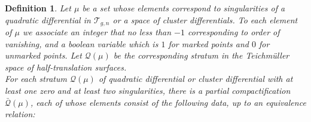 \documentclass[12pt]{article}
\newtheorem{definition}[theorem]{Definition}
\begin{document}
\begin{definition}\label{DefCompactification} Let $\mu$ be a set whose elements correspond to singularities of a quadratic differential in $\mathcal{T}_{g,n}$ or a space of cluster differentials. To each element of $\mu$ we associate an integer that no less than $-1$ corresponding to order of vanishing, and a boolean variable which is $1$ for marked points and $0$ for unmarked points. Let $\mathcal{Q}(\mu)$ be the corresponding stratum in the Teichm\"uller space of half-translation surfaces.\\

\noindent For each stratum $\mathcal{Q}(\mu)$ of quadratic differential or cluster differential with at least one zero and at least two singularities, there is a partial compactification $\bar{\mathcal{Q}}(\mu)$, each of whose elements consist of the following data, up to an equivalence relation:


\end{definition}
\end{document}
